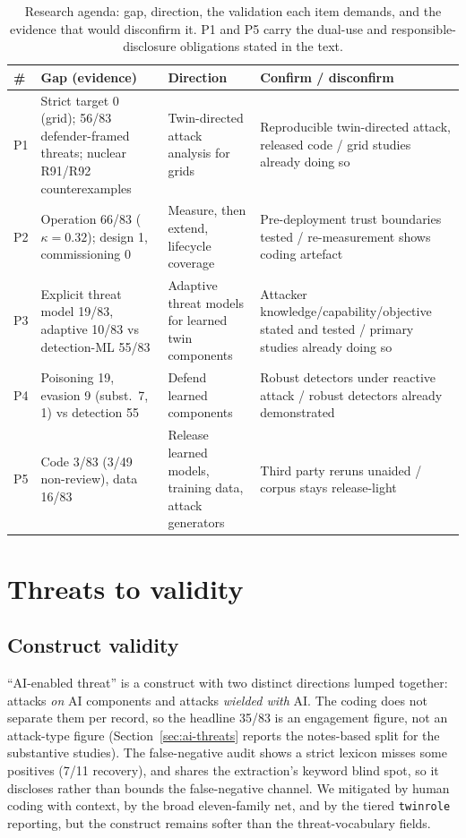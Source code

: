 \documentclass[preprint,12pt]{elsarticle}
\renewcommand{\_}{\plainunderscore\allowbreak}
\begin{document}
\begin{table}[t]
\centering
\caption{Research agenda: gap, direction, the validation each item demands, and the evidence
that would disconfirm it. P1 and P5 carry the dual-use and responsible-disclosure
obligations stated in the text.}
\label{tab:agenda}
\small
\begin{tabular}{@{}p{0.5cm}p{3.3cm}p{4.1cm}p{4.5cm}@{}}
\toprule
\# & Gap (evidence) & Direction & Confirm / disconfirm \\
\midrule
P1 & Strict target 0 (grid); 56/83 defender-framed threats; nuclear R91/R92 counterexamples & Twin-directed attack analysis for grids & Reproducible twin-directed attack, released code / grid studies already doing so \\
P2 & Operation 66/83 ($\kappa=0.32$); design 1, commissioning 0 & Measure, then extend, lifecycle coverage & Pre-deployment trust boundaries tested / re-measurement shows coding artefact \\
P3 & Explicit threat model 19/83, adaptive 10/83 vs detection-ML 55/83 & Adaptive threat models for learned twin components & Attacker knowledge/capability/objective stated and tested / primary studies already doing so \\
P4 & Poisoning 19, evasion 9 (subst.\ 7, 1) vs detection 55 & Defend learned components & Robust detectors under reactive attack / robust detectors already demonstrated \\
P5 & Code 3/83 (3/49 non-review), data 16/83 & Release learned models, training data, attack generators & Third party reruns unaided / corpus stays release-light \\
\bottomrule
\end{tabular}
\end{table}

\section{Threats to validity}\label{sec:validity}

\subsection{Construct validity}
``AI-enabled threat'' is a construct with two distinct directions lumped together: attacks
\emph{on} AI components and attacks \emph{wielded with} AI. The coding does not separate them
per record, so the headline 35/83 is an engagement figure, not an attack-type figure
(Section~\ref{sec:ai-threats} reports the notes-based split for the substantive studies). The
false-negative audit shows a strict lexicon misses
some positives (7/11 recovery), and shares the extraction's keyword blind spot, so it
discloses rather than bounds the false-negative channel. We mitigated by human coding with
context, by the broad eleven-family net, and by the tiered \texttt{twin\_role} reporting, but
the construct remains softer than the threat-vocabulary fields.
\end{document}
